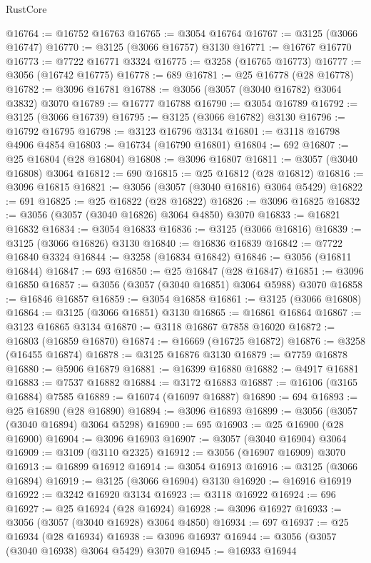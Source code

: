 \begin{lexlean}{RustCore}
\begin{coremodule}
@16764 := @16752 @16763
@16765 := @3054 @16764
@16767 := @3125 (@3066 @16747)
@16770 := @3125 (@3066 @16757) @3130
@16771 := @16767 @16770
@16773 := @7722 @16771 @3324
@16775 := @3258 (@16765 @16773)
@16777 := @3056 (@16742 @16775)
@16778 := 689
@16781 := @25 @16778 (@28 @16778)
@16782 := @3096 @16781
@16788 := @3056 (@3057 (@3040 @16782) @3064 @3832) @3070
@16789 := @16777 @16788
@16790 := @3054 @16789
@16792 := @3125 (@3066 @16739)
@16795 := @3125 (@3066 @16782) @3130
@16796 := @16792 @16795
@16798 := @3123 @16796 @3134
@16801 := @3118 @16798 @4906 @4854
@16803 := @16734 (@16790 @16801)
@16804 := 692
@16807 := @25 @16804 (@28 @16804)
@16808 := @3096 @16807
@16811 := @3057 (@3040 @16808) @3064
@16812 := 690
@16815 := @25 @16812 (@28 @16812)
@16816 := @3096 @16815
@16821 := @3056 (@3057 (@3040 @16816) @3064 @5429)
@16822 := 691
@16825 := @25 @16822 (@28 @16822)
@16826 := @3096 @16825
@16832 := @3056 (@3057 (@3040 @16826) @3064 @4850) @3070
@16833 := @16821 @16832
@16834 := @3054 @16833
@16836 := @3125 (@3066 @16816)
@16839 := @3125 (@3066 @16826) @3130
@16840 := @16836 @16839
@16842 := @7722 @16840 @3324
@16844 := @3258 (@16834 @16842)
@16846 := @3056 (@16811 @16844)
@16847 := 693
@16850 := @25 @16847 (@28 @16847)
@16851 := @3096 @16850
@16857 := @3056 (@3057 (@3040 @16851) @3064 @5988) @3070
@16858 := @16846 @16857
@16859 := @3054 @16858
@16861 := @3125 (@3066 @16808)
@16864 := @3125 (@3066 @16851) @3130
@16865 := @16861 @16864
@16867 := @3123 @16865 @3134
@16870 := @3118 @16867 @7858 @16020
@16872 := @16803 (@16859 @16870)
@16874 := @16669 (@16725 @16872)
@16876 := @3258 (@16455 @16874)
@16878 := @3125 @16876 @3130
@16879 := @7759 @16878
@16880 := @5906 @16879
@16881 := @16399 @16880
@16882 := @4917 @16881
@16883 := @7537 @16882
@16884 := @3172 @16883
@16887 := @16106 (@3165 @16884) @7585
@16889 := @16074 (@16097 @16887)
@16890 := 694
@16893 := @25 @16890 (@28 @16890)
@16894 := @3096 @16893
@16899 := @3056 (@3057 (@3040 @16894) @3064 @5298)
@16900 := 695
@16903 := @25 @16900 (@28 @16900)
@16904 := @3096 @16903
@16907 := @3057 (@3040 @16904) @3064
@16909 := @3109 (@3110 @2325)
@16912 := @3056 (@16907 @16909) @3070
@16913 := @16899 @16912
@16914 := @3054 @16913
@16916 := @3125 (@3066 @16894)
@16919 := @3125 (@3066 @16904) @3130
@16920 := @16916 @16919
@16922 := @3242 @16920 @3134
@16923 := @3118 @16922
@16924 := 696
@16927 := @25 @16924 (@28 @16924)
@16928 := @3096 @16927
@16933 := @3056 (@3057 (@3040 @16928) @3064 @4850)
@16934 := 697
@16937 := @25 @16934 (@28 @16934)
@16938 := @3096 @16937
@16944 := @3056 (@3057 (@3040 @16938) @3064 @5429) @3070
@16945 := @16933 @16944

\end{coremodule}
\end{lexlean}

